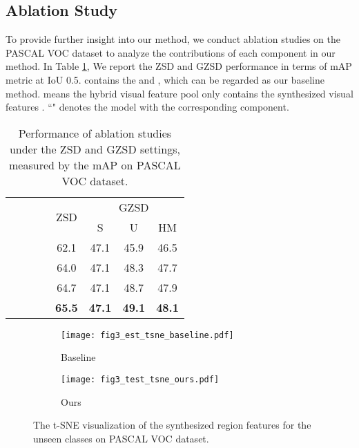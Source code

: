 \documentclass[10pt,twocolumn,letterpaper]{article}
\begin{document}
\subsection{Ablation Study}
\label{ablation_study}
To provide further insight into our method, we conduct ablation studies on the PASCAL VOC dataset to analyze the contributions of each component in our method. In Table \ref{ablation}, We report the ZSD and GZSD performance in terms of mAP metric at IoU 0.5.  contains the  and , which can be regarded as our baseline method.  means the hybrid visual feature pool  only contains the synthesized visual features . ``" denotes the model with the corresponding component.

\begin{table}[t]
  \centering

  \caption{Performance of ablation studies under the ZSD and GZSD settings, measured by the mAP on PASCAL VOC dataset.}
\renewcommand\tabcolsep{5.7pt}
    \begin{tabular}{cccccccc}
    \toprule
    \multirow{2}[4]{*}{} & \multirow{2}[4]{*}{} & \multirow{2}[4]{*}{} & \multirow{2}[4]{*}{} & \multirow{2}[4]{*}{ZSD} & \multicolumn{3}{c}{GZSD} \\
\cmidrule{6-8}          &       &       &       &       & S     & U     & HM \\
    \midrule
         &       &       &       & 62.1     &47.1     &45.9      & 46.5  \\
         &      &       &       &64.0       &47.1       &48.3       & 47.7 \\
         &      &      &       &64.7       &47.1       &48.7       &47.9  \\
         &      &      &   &\textbf{65.5}     & \textbf{47.1}      & \textbf{49.1}      & \textbf{48.1} \\
    \bottomrule
    \end{tabular}\label{ablation}\end{table}\begin{figure}
  \centering
\begin{subfigure}{0.48\linewidth}
    \texttt{[image: fig3\_est\_tsne\_baseline.pdf]}
    \caption{Baseline} \label{seen}
  \end{subfigure}
  \hfill
  \begin{subfigure}{0.48\linewidth}
    \texttt{[image: fig3\_test\_tsne\_ours.pdf]}
    \caption{Ours}
    \label{unseen}
  \end{subfigure}
  \caption{The t-SNE \cite{van2008visualizing} visualization of the synthesized region features for the unseen classes on PASCAL VOC dataset.}
  \label{fig:short}
\label{tsne}
\vspace{-3.0mm}
\end{figure}
\end{document}
